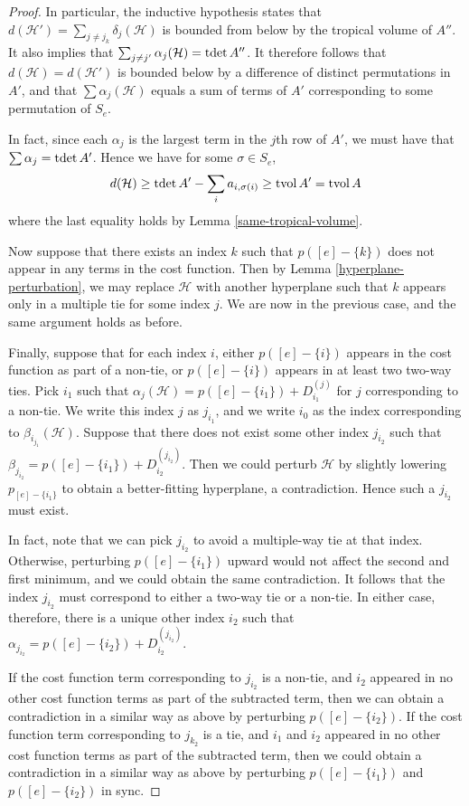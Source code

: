 \documentclass[12pt]{extarticle}
\numberwithin{theorem}{section}
\newcommand{\tvol}{\text{tvol\,}}
\newcommand{\tdet}{\text{tdet\,}}
\begin{document}
\begin{proof}
In particular, the inductive hypothesis states that $d(\mathcal H') =\sum_{j\neq j_k} \delta_j(\mathcal H)$ is bounded from below by the tropical volume of $A''$. It also implies that $\sum_{j\neq j'}\alpha_j(\mathcal H) = \tdet A''$. It therefore follows that $d(\mathcal H)=d(\mathcal H')$ is bounded below by a difference of distinct permutations in $A'$, and that $\sum \alpha_j(\mathcal H)$ equals a sum of terms of $A'$ corresponding to some permutation of $S_e$. 

In fact, since each $\alpha_j$ is the largest term in the $j$th row of $A'$, we must have that $\sum \alpha_j = \tdet A'$. Hence we have for some $\sigma\in S_e$,
\[d(\mathcal H)\geq \tdet A' - \sum_i a_{i,\sigma(i)}\geq \tvol A' = \tvol A\]
where the last equality holds by Lemma \ref{same-tropical-volume}.

Now suppose that there exists an index $k$ such that $p({[e]-\{k\}})$ does not appear in any terms in the cost function. Then by Lemma \ref{hyperplane-perturbation}, we may replace $\mathcal H$ with another hyperplane such that $k$ appears only in a multiple tie for some index $j$. We are now in the previous case, and the same argument holds as before.

Finally, suppose that for each index $i$, either $p({[e] - \{i\}})$ appears in the cost function as part of a non-tie, or $p({[e] - \{i\}})$ appears in at least two two-way ties. Pick $i_1$ such that $\alpha_j(\mathcal H) = p([e]-\{i_1\})+D^{(j)}_{i_1}$ for $j$ corresponding to a non-tie. We write this index $j$ as $j_{i_1}$, and we write $i_0$ as the index corresponding to $\beta_{i_{j_1}}(\mathcal H)$. Suppose that there does not exist some other index $j_{i_2}$ such that $\beta_{j_{i_2}}=p({[e]-\{i_1\}})+D^{(j_{i_2})}_{i_2}$. Then we could perturb $\mathcal H$ by slightly lowering $p_{[e]-\{i_1\}}$ to obtain a better-fitting hyperplane, a contradiction. Hence such a $j_{i_2}$ must exist.

In fact, note that we can pick $j_{i_2}$ to avoid a multiple-way tie
at that index. Otherwise, perturbing $p({[e]-\{i_1\}})$ upward would
not affect the second and first minimum, and we could obtain the same contradiction. It follows that the index $j_{i_2}$ must correspond to either a two-way tie or a non-tie. In either case, therefore, there is a unique other index $i_2$ such that $\alpha_{j_{i_2}}=p([e]-\{i_2\}) +D^{(j_{i_2})}_{i_2}$.

If the cost function term corresponding to $j_{i_2}$ is a non-tie, and $i_2$ appeared in no other cost function terms as part of the subtracted term, then we can obtain a contradiction in a similar way as above by perturbing $p({[e]-\{i_2\}})$. If the cost function term corresponding to $j_{k_2}$ is a tie, and $i_1$ and $i_2$ appeared in no other cost function terms as part of the subtracted term, then we could obtain a contradiction in a similar way as above by perturbing $p({[e]-\{i_1\}})$ and $p({[e]-\{i_2\}})$ in sync.


\end{proof}
\end{document}
